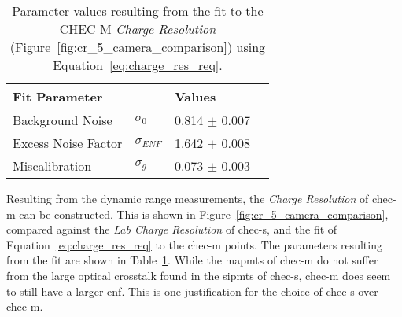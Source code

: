\begin{table}[h!]
\centering
\begin{tabular}{ll|ll} \toprule
    Fit Parameter        &                & Values             \\ \midrule
    Background Noise     & $\sigma_0$     & 0.814 $\pm$ 0.007  \\
    Excess Noise Factor  & $\sigma_{ENF}$ & 1.642 $\pm$ 0.008  \\
    Miscalibration       & $\sigma_g$     & 0.073 $\pm$ 0.003  \\ \bottomrule
\end{tabular}
\caption{Parameter values resulting from the fit to the CHEC-M \textit{Charge Resolution} (Figure~\ref{fig:cr_5_camera_comparison}) using Equation~\ref{eq:charge_res_req}.}
\label{table:cr_5_camera_comparison}
\end{table}

Resulting from the dynamic range measurements, the \textit{Charge Resolution} of \gls{chec-m} can be constructed. This is shown in Figure~\ref{fig:cr_5_camera_comparison}, compared against the \textit{Lab Charge Resolution} of \gls{chec-s}, and the fit of Equation~\ref{eq:charge_res_req} to the \gls{chec-m} points. The parameters resulting from the fit are shown in Table~\ref{table:cr_5_camera_comparison}. While the \glspl{mapmt} of \gls{chec-m} do not suffer from the large optical crosstalk found in the \glspl{sipmt} of \gls{chec-s}, \gls{chec-m} does seem to still have a larger \gls{enf}. This is one justification for the choice of \gls{chec-s} over \gls{chec-m}.